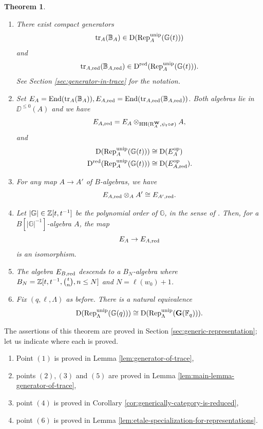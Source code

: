 \documentclass[a4paper, 10pt, oneside, reqno]{amsart}
\theoremstyle{plain}
\newtheorem{thm}{Theorem}[subsection]
\theoremstyle{definition}
\theoremstyle{remark}
\newcommand{\Gbb}{\mathbb{G}}
\newcommand{\RR}{\mathrm{R}}
\newcommand{\opp}{\mathrm{op}}
\newcommand{\HHH}{\mathrm{HH}}
\begin{document}
\begin{thm}\label{thm:intro-main-properties-of-generic-representation}
\begin{enumerate}
\item There exist compact generators
\[
\tr_A(\mathbb{B}_A) \in \DD(\Rep_A^{\unip}(\Gbb(t)))
\]
and
\[
\tr_{A,\red}(\mathbb{B}_{A,\red}) \in \DD^{\red}(\Rep_A^{\unip}(\Gbb(t))).
\]
See Section \ref{sec:generator-in-trace} for the notation.
\item Set $E_A = \mathrm{End}(\mathrm{tr}_A(\mathbb{B}_A)), E_{A,\mathrm{red}} = \mathrm{End}(\mathrm{tr}_{A,\mathrm{red}}(\mathbb{B}_{A, \mathrm{red}}))$. Both algebras lie in $\DD^{\leq 0}(A)$ and we have 
$$E_{A,\red} = E_A \otimes_{\HHH(\RR_A^{\Wbf}, \psi_t \circ \sigma)} A,$$
and 
\begin{align*}
\DD(\Rep_A^{\unip}(\Gbb(t))) &\cong \DD(E_{A}^{\opp}) \\
\DD^{\red}(\Rep_A^{\unip}(\Gbb(t))) &\cong \DD(E_{A,\red}^{\opp}).
\end{align*}
\item For any map $A \to A'$ of $B$-algebras, we have 
$$E_{A, \mathrm{red}} \otimes_A A' \cong E_{A',\mathrm{red}}.$$
\item Let $|\Gbb| \in \Z[t,t^{-1}]$ be the polynomial order of $\Gbb$, in the sense of \cite{BroueMalle}. Then, for a $B[|\Gbb|^{-1}]$-algebra $A$, the map 
$$E_{A} \to E_{A,\mathrm{red}}$$ 
is an isomorphism. 
\item The algebra $E_{B, \mathrm{red}}$ descends to a $B_N$-algebra where $B_N = \mathbb{Z}[t,t^{-1}, \binom{t}{n}, n \leq N]$ and $N = \ell(w_0) + 1$.
\item Fix $(q, \ell, \Lambda)$ as before. There is a natural equivalence 
$$\DD(\Rep^{\unip}_{\Lambda}(\Gbb(q))) \cong \DD(\Rep^{\unip}_{\Lambda}(\Gbf(\Fq))).$$ 
\end{enumerate}
\end{thm} 

The assertions of this theorem are proved in Section \ref{sec:generic-representation}; let us indicate where each is proved. 
\begin{enumerate}
\item Point $(1)$ is proved in Lemma \ref{lem:generator-of-trace},
\item points $(2), (3)$ and $(5)$ are proved in Lemma \ref{lem:main-lemma-generator-of-trace}, 
\item point $(4)$ is proved in Corollary \ref{cor:generically-category-is-reduced}, 
\item point $(6)$ is proved in Lemma \ref{lem:etale-specialization-for-representations}. 
\end{enumerate}
\end{document}

